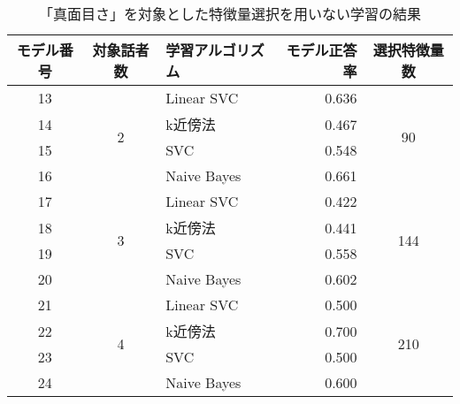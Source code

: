 \begin{table}[tpb]
    \caption{「真面目さ」を対象とした特徴量選択を用いない学習の結果}
    \centering
    \begin{tabular}{|c|c|l|r|c|}
        \hline
        モデル番号 & 対象話者数 & 学習アルゴリズム & モデル正答率 & 選択特徴量数 \\\hline\hline
        13 & \multirow{4}{*}{2} & Linear SVC & 0.636 & \multirow{4}{*}{90} \\ \cline{1-1}\cline{3-4}
        14 & & k近傍法 & 0.467 & \\ \cline{1-1}\cline{3-4}
        15 & & SVC & 0.548 & \\ \cline{1-1}\cline{3-4}
        16 & & Naive Bayes & 0.661 & \\ \hline
        17 & \multirow{4}{*}{3} & Linear SVC & 0.422 & \multirow{4}{*}{144} \\ \cline{1-1}\cline{3-4}
        18 & & k近傍法 & 0.441 & \\ \cline{1-1}\cline{3-4}
        19 & & SVC & 0.558 & \\ \cline{1-1}\cline{3-4}
        20 & & Naive Bayes & 0.602 & \\ \hline
        21 & \multirow{4}{*}{4} & Linear SVC & 0.500 & \multirow{4}{*}{210} \\ \cline{1-1}\cline{3-4}
        22 & & k近傍法 & 0.700 & \\ \cline{1-1}\cline{3-4}
        23 & & SVC & 0.500 & \\ \cline{1-1}\cline{3-4}
        24 & & Naive Bayes & 0.600 & \\ \hline
    \end{tabular}
    \label{tab:seriousness_learning_result_without_FS}
\end{table}

